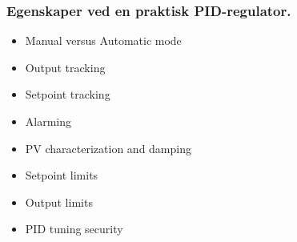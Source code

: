 \documentclass[aspectratio=169,xcolor=dvipsnames]{beamer}
\begin{document}
%
%
%
%
%
%
%
%
%
%
%
%
%
%
%
\begin{frame}
	\frametitle{Egenskaper ved en praktisk PID-regulator.}

\begin{itemize}
\item Manual versus Automatic mode\pause 
\item Output tracking\pause 
\item Setpoint tracking\pause 
\item Alarming\pause 
\item PV characterization and damping \pause 
\item Setpoint limits\pause 
\item Output limits\pause 
\item PID tuning security
\end{itemize}

\end{frame}
%
%
%
%
\end{document}
